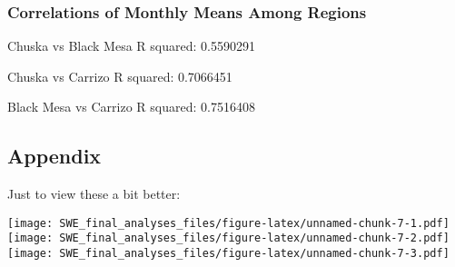 \documentclass[]{article}
\begin{document}
\hypertarget{correlations-of-monthly-means-among-regions}{%
\subsubsection{Correlations of Monthly Means Among
Regions}\label{correlations-of-monthly-means-among-regions}}

Chuska vs Black Mesa R squared: 0.5590291

Chuska vs Carrizo R squared: 0.7066451

Black Mesa vs Carrizo R squared: 0.7516408

\hypertarget{appendix}{%
\subsection{Appendix}\label{appendix}}

Just to view these a bit better:

\texttt{[image: SWE\_final\_analyses\_files/figure-latex/unnamed-chunk-7-1.pdf]}
\texttt{[image: SWE\_final\_analyses\_files/figure-latex/unnamed-chunk-7-2.pdf]}
\texttt{[image: SWE\_final\_analyses\_files/figure-latex/unnamed-chunk-7-3.pdf]}
\end{document}

